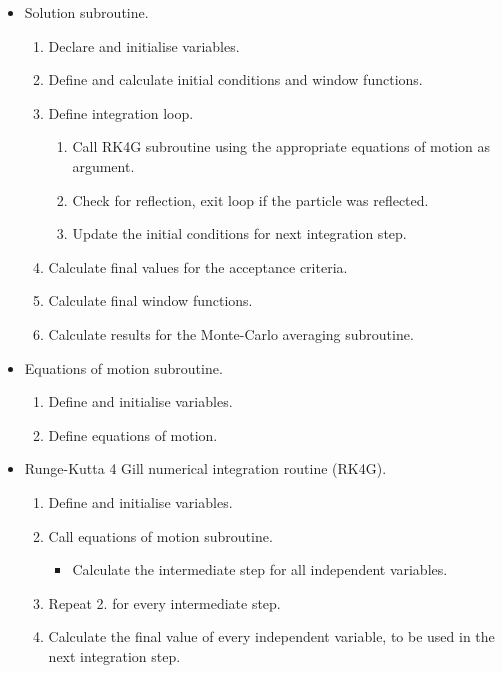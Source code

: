\begin{itemize}
\item Solution subroutine.
\begin{enumerate}
\item Declare and initialise variables.
\item Define and calculate initial conditions and window functions.
\item Define integration loop.
\begin{enumerate}
\item Call RK4G subroutine using the appropriate equations of motion as argument.
\item Check for reflection, exit loop if the particle was reflected.
\item Update the initial conditions for next integration step.
\end{enumerate}
\item Calculate final values for the acceptance criteria.
\item Calculate final window functions.
\item Calculate results for the Monte-Carlo averaging subroutine.
\end{enumerate}
\end{itemize}

\begin{itemize}
\item Equations of motion subroutine.
\begin{enumerate}
\item Define and initialise variables.
\item Define equations of motion.
\end{enumerate}
\end{itemize}

\begin{itemize}
\item Runge-Kutta 4 Gill numerical integration routine (RK4G).
\begin{enumerate}
\item Define and initialise variables.
\item Call equations of motion subroutine.
\begin{itemize}
\item Calculate the intermediate step for all independent variables.
\end{itemize}
\item Repeat 2. for every intermediate step.
\item Calculate the final value of every independent variable, to be used in the next integration step.
\end{enumerate}
\end{itemize}

